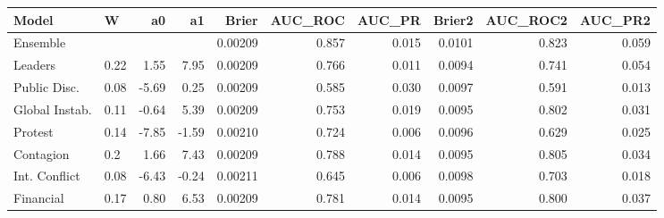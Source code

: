 \begin{table}[ht]
\centering
\begin{tabular}{llrrrrrrrr}
  \hline
Model & W & a0 & a1 & Brier & AUC\_ROC & AUC\_PR & Brier2 & AUC\_ROC2 & AUC\_PR2 \\ 
  \hline
Ensemble &  &  &  & 0.00209 & 0.857 & 0.015 & 0.0101 & 0.823 & 0.059 \\ 
  Leaders & 0.22 & 1.55 & 7.95 & 0.00209 & 0.766 & 0.011 & 0.0094 & 0.741 & 0.054 \\ 
  Public Disc. & 0.08 & -5.69 & 0.25 & 0.00209 & 0.585 & 0.030 & 0.0097 & 0.591 & 0.013 \\ 
  Global Instab. & 0.11 & -0.64 & 5.39 & 0.00209 & 0.753 & 0.019 & 0.0095 & 0.802 & 0.031 \\ 
  Protest & 0.14 & -7.85 & -1.59 & 0.00210 & 0.724 & 0.006 & 0.0096 & 0.629 & 0.025 \\ 
  Contagion & 0.2 & 1.66 & 7.43 & 0.00209 & 0.788 & 0.014 & 0.0095 & 0.805 & 0.034 \\ 
  Int. Conflict & 0.08 & -6.43 & -0.24 & 0.00211 & 0.645 & 0.006 & 0.0098 & 0.703 & 0.018 \\ 
  Financial & 0.17 & 0.80 & 6.53 & 0.00209 & 0.781 & 0.014 & 0.0095 & 0.800 & 0.037 \\ 
   \hline
\end{tabular}
\end{table}
